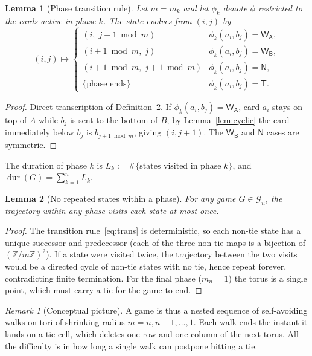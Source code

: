 \documentclass[11pt]{article}
\newtheorem{lemma}{Lemma}
\theoremstyle{definition}
\theoremstyle{remark}
\newtheorem{remark}{Remark}
\DeclareMathOperator{\dur}{dur}
\newcommand{\WA}{\mathsf{W_A}}
\newcommand{\WB}{\mathsf{W_B}}
\newcommand{\TT}{\mathsf{T}}
\newcommand{\NN}{\mathsf{N}}
\newcommand{\Z}{\mathbb{Z}}
\begin{document}
\begin{lemma}[Phase transition rule]\label{lem:trans}
Let $m = m_k$ and let $\phi_k$ denote $\phi$ restricted to the cards active in phase $k$. The state evolves from $(i, j)$ by
\begin{equation}\label{eq:trans}
(i, j) \longmapsto
\begin{cases}
(i,\; j + 1 \bmod m) & \phi_k(a_i, b_j) = \WA,\\
(i + 1 \bmod m,\; j) & \phi_k(a_i, b_j) = \WB,\\
(i + 1 \bmod m,\; j + 1 \bmod m) & \phi_k(a_i, b_j) = \NN,\\
\{\text{phase ends}\} & \phi_k(a_i, b_j) = \TT.
\end{cases}
\end{equation}
\end{lemma}
\begin{proof}
Direct transcription of Definition~2. If $\phi_k(a_i, b_j) = \WA$, card $a_i$ stays on top of $A$ while $b_j$ is sent to
the bottom of $B$; by Lemma~\ref{lem:cyclic} the card immediately below $b_j$ is $b_{j+1 \bmod m}$, giving $(i, j + 1)$.
The $\WB$ and $\NN$ cases are symmetric.
\end{proof}

The duration of phase $k$ is $L_k := \#\{\text{states visited in phase } k\}$, and $\dur(G) = \sum_{k=1}^n L_k$.

\begin{lemma}[No repeated states within a phase]\label{lem:saw}
For any game $G \in \mathcal G_n$, the trajectory within any phase visits each state at most once.
\end{lemma}
\begin{proof}
The transition rule~\eqref{eq:trans} is deterministic, so each non-tie state has a unique successor and predecessor
(each of the three non-tie maps is a bijection of $(\Z/m\Z)^2$). If a state were visited twice, the trajectory between
the two visits would be a directed cycle of non-tie states with no tie, hence repeat forever, contradicting finite
termination. For the final phase ($m_n = 1$) the torus is a single point, which must carry a tie for the game to end.
\end{proof}

\begin{remark}[Conceptual picture]
A game is thus a nested sequence of self-avoiding walks on tori of shrinking radius $m = n, n-1, \dots, 1$. Each walk
ends the instant it lands on a tie cell, which deletes one row and one column of the next torus. All the difficulty is
in how long a single walk can postpone hitting a tie.
\end{remark}
\end{document}
